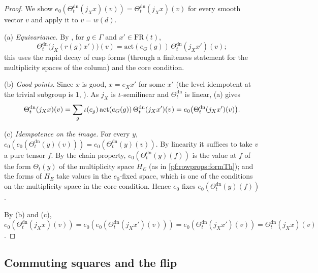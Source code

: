 \begin{proof}
We show $e_0(\Theta^{\mathrm{dn}}_t(j_Xx)(v))=\Theta^{\mathrm{dn}}_t(j_Xx)(v)$ for every smooth vector $v$ and apply it to
$v=w(d)$.

(a) \emph{Equivariance.} By , for
$g\in\Gamma$ and $x'\in\mathrm{FR}(t)$,
\[
\Theta^{\mathrm{dn}}_t\bigl(j_X(r(g)x')\bigr)(v)=\mathrm{act}(e_G(g))\,\Theta^{\mathrm{dn}}_t(j_Xx')(v);
\]
this uses the rapid decay of cusp forms (through a finiteness statement for the multiplicity spaces of the column) and
the core condition.

(b) \emph{Good points.} Since $x$ is good, $x=e_Xx'$ for some $x'$ (the level idempotent at the trivial subgroup is $1$,
). As $j_X$ is $\iota$-semilinear and $\Theta^{\mathrm{dn}}_t$ is
linear, (a) gives
\[
\Theta^{\mathrm{dn}}_t(j_Xx)(v)=\sum_g\iota(c_g)\,\mathrm{act}(e_G(g))\,\Theta^{\mathrm{dn}}_t(j_Xx')(v)
=e_0\bigl(\Theta^{\mathrm{dn}}_t(j_Xx')(v)\bigr).
\]

(c) \emph{Idempotence on the image.} For every $y$, $e_0(e_0(\Theta^{\mathrm{dn}}_t(y)(v)))=e_0(\Theta^{\mathrm{dn}}_t(y)(v))$. By
linearity it suffices to take $v$ a pure tensor $f$. By the chain property, $e_0(\Theta^{\mathrm{dn}}_t(y)(f))$ is the value at
$f$ of the form $\Theta_t(y)$ of the multiplicity space $H_E$ (as in \cref{pf:rowprops:formTh}); and the forms of $H_E$ take
values in the $e_0$-fixed space, which is one of the conditions on the multiplicity space in the core condition. Hence
$e_0$ fixes $e_0(\Theta^{\mathrm{dn}}_t(y)(f))$.

By (b) and (c), $e_0(\Theta^{\mathrm{dn}}_t(j_Xx)(v))=e_0(e_0(\Theta^{\mathrm{dn}}_t(j_Xx')(v)))=e_0(\Theta^{\mathrm{dn}}_t(j_Xx')(v))
=\Theta^{\mathrm{dn}}_t(j_Xx)(v)$.
\end{proof}

\subsection{Commuting squares and the flip}\label{sec:pf:rowprops:flip}

